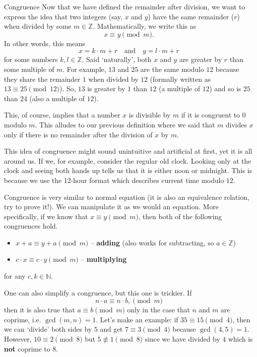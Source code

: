 \documentclass[final]{beamer}
\newlength{\colwidth}
\newcommand{\N}{\mathbb{N}}
\newcommand{\Z}{\mathbb{Z}}
\begin{document}
\begin{frame}[t]
\begin{columns}[t]
\begin{column}{\colwidth}
\begin{block}{Congruence}
 Now that we have defined the remainder after division, we want to express the
 idea that two integers (say, $x$ and $y$) \alert{have the same remainder} ($r$)
 \alert{when divided by some $m \in \Z$}. Mathematically, we write this as
 \[
  x \equiv y \pmod{m}.
 \]
 In other words, this means
 \[
  x = k \cdot m + r \quad \text{and} \quad y = l \cdot m + r
 \]
 for some numbers $k,l \in \Z$. Said `naturally', both $x$ and $y$ are greater
 by $r$ than some multiple of $m$. For example, $13$ and $25$ are the same
 modulo $12$ because they share the remainder $1$ when divided by $12$ (formally
 written as  $13 \equiv 25 \pmod{12}$). So, $13$ is greater by $1$ than $12$ (a
 multiple of $12$) and so is $25$ than $24$ (also a multiple of $12$). 

 This, of course, implies that a number $x$ is \alert{divisible by $m$} if
 \alert{it is congruent to $0$} modulo $m$. This alludes to our previous
 definition where we said that $m$ divides $x$ only if there is no remainder
 after the division of $x$ by $m$.

 This idea of congruence might sound unintuitive and artificial at first, yet it
 is all around us. If we, for example, consider the regular old clock. Looking
 only at the clock and seeing both hands up tells us that it is either noon or
 midnight. This is because we use the 12-hour format which describes current
 time modulo $12$.

 \alert{Congruence is very similar to normal equation} (it is also an
 equivalence relation, try to prove it!). We can manipulate it as we would an
 equation. More specifically, if we know that $x \equiv y \pmod{m}$, then both
 of the following congruences hold.
 \begin{itemize}[label=\textbullet,left=24pt]
  \item $x+a \equiv y+a \pmod{m}$ -- \textbf{adding} (also works for subtracting,
   so $a \in \mathbb{Z}$)
  \item $c \cdot x \equiv c \cdot y \pmod{m}$ -- \textbf{multiplying}
 \end{itemize}
 for any $c,k \in \N$.

 One can also \alert{simplify a congruence}, but this one is trickier. If
 \[
  n \cdot a \equiv n \cdot b, \pmod{m}
 \]
 then \alert{it is also true that} $a \equiv b \pmod{m}$ \alert{only in the case
 that} $n$ and $m$ \alert{are coprime}, i.e. $\gcd(m,n) = 1$. Let's make an
 example: if $35 \equiv 15 \pmod{4}$, then we can `divide' both sides by $5$ and
 get $7 \equiv 3 \pmod{4}$ because $\gcd(4,5) = 1$. However, $10 \equiv 2
 \pmod{8}$ but $5 \not\equiv 1 \pmod{8}$ since we have divided by $4$ which is
 \textbf{not} coprime to $8$.


\end{block}
\end{column}
\end{columns}
\end{frame}
\end{document}
